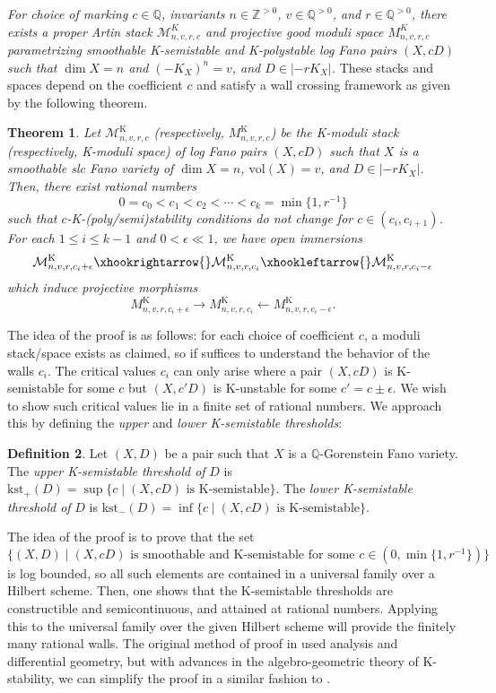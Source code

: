 \documentclass[11pt]{amsart}
\numberwithin{equation}{section}
\newtheorem{theorem}{Theorem}[section]
\theoremstyle{definition}
\newtheorem{definition}[theorem]{Definition}
\newcommand{\bQ}{\mathbb{Q}}
\newcommand{\calM}{\mathcal{M}}
\newcommand{\bZ}{\mathbb{Z}}
\newcommand{\vol}{\mathrm{vol}}
\newcommand{\kst}{\mathrm{kst}}
\newcommand{\cM}{\mathcal M}
\newcommand{\K}{\mathrm{K}}
\begin{document}
\textit{For choice of marking $c \in \bQ$, invariants $n \in\bZ^{> 0}$, $v \in \bQ^{>0}$, and $r \in \bQ^{>0}$, there exists a proper Artin stack $\calM^K_{n,v,r,c}$ and projective good moduli space $M^K_{n,v,r,c}$ parametrizing smoothable K-semistable and K-polystable log Fano pairs $(X,cD)$ such that $\dim X = n$ and $(-K_X)^n = v$, and $D \in |-rK_X|$.} These stacks and spaces depend on the coefficient $c$ and satisfy a wall crossing framework as given by the following theorem. 


\begin{theorem}
Let $\cM^\K_{n,v,r,c}$ (respectively, $M^\K_{n,v,r,c}$) be the K-moduli stack (respectively, K-moduli space) of log Fano pairs $(X,cD)$ such that $X$ is a smoothable slc Fano variety of $\dim X = n$, $\vol(X) = v$, and $D \in |-rK_X|$.  Then, there exist rational numbers \[0=c_0<c_1<c_2<\cdots<c_k=\min\{1,r^{-1}\}\] such that $c$-K-(poly/semi)stability conditions do not change for $c\in (c_i,c_{i+1})$. For each $1\leq i\leq k-1$ and $0<\epsilon\ll 1$, we have open immersions
 \[
 \cM^\K_{n,v,r,c_i+\epsilon}\xhookrightarrow{}
 \cM^\K_{n,v,r,c_i}\xhookleftarrow{}\cM^\K_{n,v,r,c_i-\epsilon}
 \]
 which induce projective morphisms
 \[
 M^\K_{n,v,r,c_i+\epsilon}\xrightarrow{}
 M^\K_{n,v,r,c_i}\xleftarrow{}M^\K_{n,v,r,c_i-\epsilon}.
 \]
\end{theorem}

The idea of the proof is as follows: for each choice of coefficient $c$, a moduli stack/space exists as claimed, so if suffices to understand the behavior of the walls $c_i$.  The critical values $c_i$ can only arise where a pair $(X,cD)$ is K-semistable for some $c$ but $(X,c'D)$ is K-unstable for some $c' = c \pm \epsilon$.  We wish to show such critical values lie in a finite set of rational numbers.  We approach this by defining the \textit{upper} and \textit{lower K-semistable thresholds}: 

\begin{definition}
    Let $(X,D)$ be a pair such that $X$ is a $\bQ$-Gorenstein Fano variety.  The \textit{upper K-semistable threshold of} $D$ is $\kst_+(D) = \sup \{ c \mid (X,cD) \text{ is K-semistable} \}$.  The \textit{lower K-semistable threshold of} $D$ is $\kst_-(D) = \inf \{ c \mid (X,cD) \text{ is K-semistable} \}$. 
\end{definition}

The idea of the proof is to prove that the set  
\[ \{(X,D) \mid (X,cD) \text{ is smoothable and K-semistable for some } c \in (0,\min\{1,r^{-1}\}) \}\]
is log bounded, so all such elements are contained in a universal family over a Hilbert scheme.  Then, one shows that the K-semistable thresholds are constructible and semicontinuous, and attained at rational numbers.  Applying this to the universal family over the given Hilbert scheme will provide the finitely many rational walls.  The original method of proof in \cite{ADLpub} used analysis and differential geometry, but with advances in the algebro-geometric theory of K-stability, we can simplify the proof in a similar fashion to \cite{Zhou}. 
\end{document}
